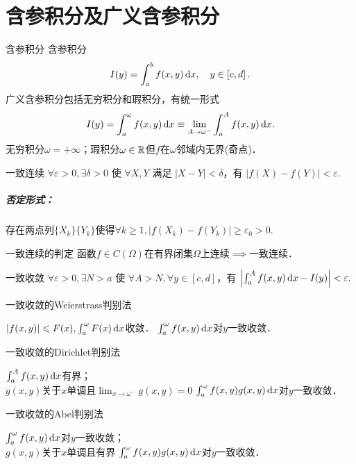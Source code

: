 \chapter{含参积分及广义含参积分}
\begin{definition}{含参积分}{}
	含参积分
	\[
		I(y)=\int_a^bf(x,y)\mathop{}\!\mathrm{d} x,\quad y\in\left[c,d\right].
	\]
	广义含参积分包括无穷积分和瑕积分，有统一形式
	\[
		I(y)=\int_a^\omega f(x,y)\mathop{}\!\mathrm{d} x\equiv\lim_{A\to\omega^-}\int_a^Af(x,y)\mathop{}\!\mathrm{d} x.
	\]
	无穷积分$\omega=+\infty$；瑕积分$\omega\in\mathbb R$但$f$在$\omega$邻域内无界(奇点)．
\end{definition}
\begin{definition}{一致连续}{}
	$\forall\varepsilon>0,\exists\delta>0$ 使 $\forall X,Y$ 满足 $\vert X-Y\vert<\delta$，有 $|f(X)-f(Y)|<\varepsilon.$
	\tcblower
	\paragraph{否定形式：}存在两点列$\{X_k\}\{Y_k\}$使得$\forall k\geqslant 1,|f(X_k)-f(Y_k)|\geqslant\varepsilon_0>0.$
\end{definition}
\begin{theorem}{一致连续的判定}{}
	函数$f\in C(\Omega)$在有界闭集$\Omega$上连续$\implies$一致连续．
\end{theorem}
\begin{definition}{一致收敛}{}
	$\forall\varepsilon>0,\exists N>a$ 使 $\forall A>N,\forall y\in[c,d]$，有 $\left|\int_a^Af(x,y)\mathop{}\!\mathrm{d} x-I(y)\right|<\varepsilon.$
\end{definition}
\begin{theorem}{一致收敛的Weierstrass判别法}{}
	\begin{center}
		$|f(x,y)|\leqslant F(x),\int_a^\omega F(x)\mathop{}\!\mathrm{d} x$收敛．
		\vthus
		$\int_a^\omega f(x,y)\mathop{}\!\mathrm{d} x$对$y$一致收敛．
	\end{center}
\end{theorem}
\begin{theorem}{一致收敛的Dirichlet判别法}{}
	\begin{center}
		$\int_a^Af(x,y)\mathop{}\!\mathrm{d} x$有界；\\
		$g(x,y)$关于$x$单调且$\lim_{x\to\omega^-}g(x,y)=0$
		\vthus
		$\int_a^\omega f(x,y)g(x,y)\mathop{}\!\mathrm{d} x$对$y$一致收敛．
	\end{center}
\end{theorem}
\begin{theorem}{一致收敛的Abel判别法}{}
	\begin{center}
		$\int_a^\omega f(x,y)\mathop{}\!\mathrm{d} x$对$y$一致收敛；\\
		$g(x,y)$关于$x$单调且有界
		\vthus
		$\int_a^\omega f(x,y)g(x,y)\mathop{}\!\mathrm{d} x$对$y$一致收敛．
	\end{center}
\end{theorem}
